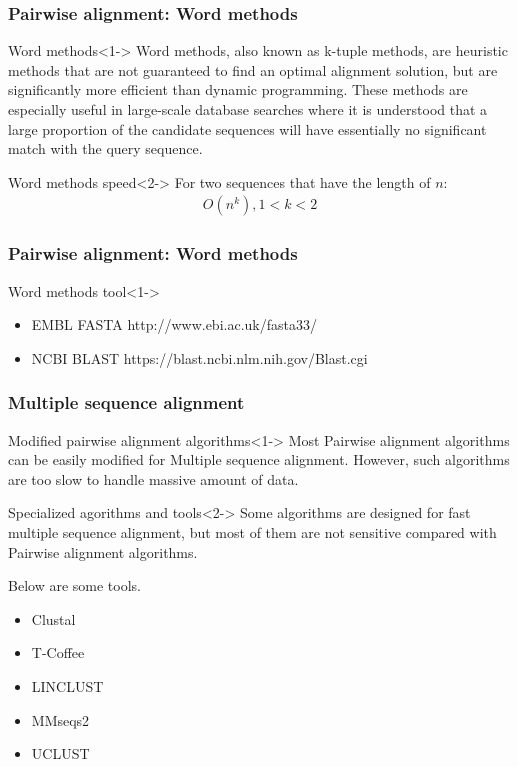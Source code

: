\documentclass[UTF8]{beamer}
\begin{document}
	\begin{frame}
	    \frametitle{Pairwise alignment: Word methods}
		\begin{block}{Word methods}<1->
			Word methods, also known as k-tuple methods, are heuristic methods that are not guaranteed to find an optimal alignment solution, 
			but are significantly more efficient than dynamic programming. 
			These methods are especially useful in large-scale database searches where it is understood that a large proportion of the candidate sequences will have essentially no significant match with the query sequence.
		\end{block}
		\begin{block}{Word methods speed}<2->
			For two sequences that have the length of $n$:
			\begin{gather*}
				O(n^k),1<k<2
			\end{gather*}
		\end{block}
    \end{frame}

	\begin{frame}
	    \frametitle{Pairwise alignment: Word methods}
		\begin{block}{Word methods tool}<1->
			\begin{itemize}
				\item EMBL FASTA
				http://www.ebi.ac.uk/fasta33/
				\item NCBI BLAST
				https://blast.ncbi.nlm.nih.gov/Blast.cgi
			\end{itemize}
		\end{block}
    \end{frame}

	\begin{frame}
	    \frametitle{Multiple sequence alignment}
		\begin{block}{Modified pairwise alignment algorithms}<1->
			Most Pairwise alignment algorithms can be easily modified for Multiple sequence alignment. However, such algorithms are too slow to handle massive amount of data.
		\end{block}
		\begin{block}{Specialized agorithms and tools}<2->
			Some algorithms are designed for fast multiple sequence alignment, but most of them are not sensitive compared with Pairwise alignment algorithms.

			Below are some tools.
			\begin{itemize}
				\item Clustal
				\item T-Coffee
				\item LINCLUST
				\item \alert{MMseqs2}
				\item UCLUST
			\end{itemize}
		\end{block}
    \end{frame}
\end{document}
